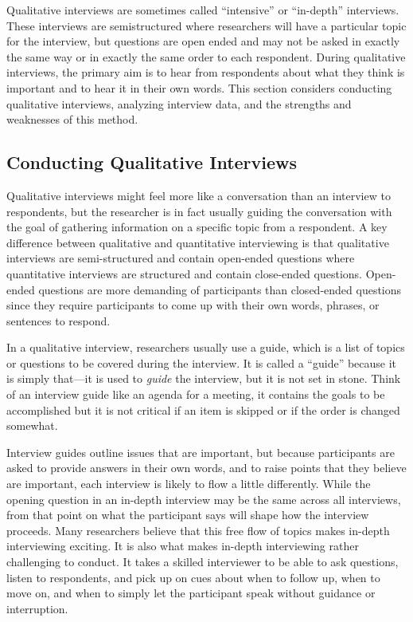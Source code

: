 Qualitative interviews are sometimes called ``intensive'' or ``in-depth'' interviews. These interviews are semistructured where researchers will have a particular topic for the interview, but questions are open ended and may not be asked in exactly the same way or in exactly the same order to each respondent. During qualitative interviews, the primary aim is to hear from respondents about what they think is important and to hear it in their own words. This section considers conducting qualitative interviews, analyzing interview data, and the strengths and weaknesses of this method.

\subsection{Conducting Qualitative Interviews}

Qualitative interviews might feel more like a conversation than an interview to respondents, but the researcher is in fact usually guiding the conversation with the goal of gathering information on a specific topic from a respondent. A key difference between qualitative and quantitative interviewing is that qualitative interviews are semi-structured and contain open-ended questions where quantitative interviews are structured and contain close-ended questions. Open-ended questions are more demanding of participants than closed-ended questions since they require participants to come up with their own words, phrases, or sentences to respond.

In a qualitative interview, researchers usually use a guide, which is a list of topics or questions to be covered during the interview. It is called a ``guide'' because it is simply that---it is used to \textit{guide} the interview, but it is not set in stone. Think of an interview guide like an agenda for a meeting, it contains the goals to be accomplished but it is not critical if an item is skipped or if the order is changed somewhat. 

Interview guides outline issues that are important, but because participants are asked to provide answers in their own words, and to raise points that they believe are important, each interview is likely to flow a little differently. While the opening question in an in-depth interview may be the same across all interviews, from that point on what the participant says will shape how the interview proceeds. Many researchers believe that this free flow of topics makes in-depth interviewing exciting. It is also what makes in-depth interviewing rather challenging to conduct. It takes a skilled interviewer to be able to ask questions, listen to respondents, and pick up on cues about when to follow up, when to move on, and when to simply let the participant speak without guidance or interruption.

